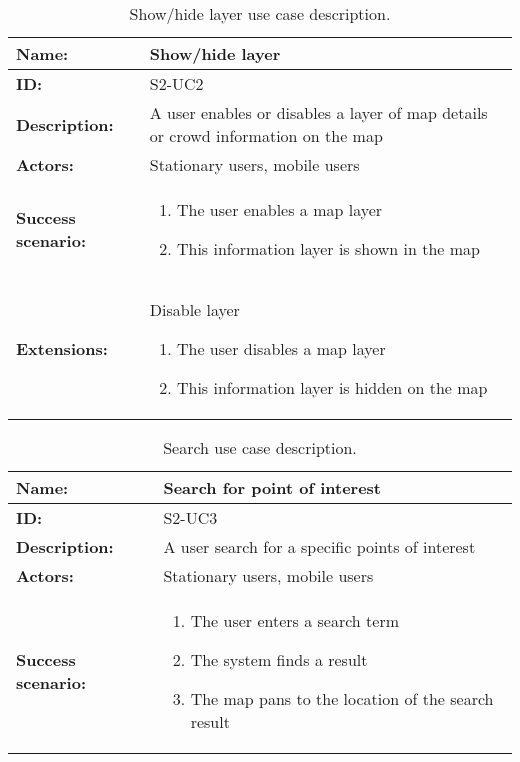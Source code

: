 \begin{table}[h!]
    \centering
    \begin{tabularx}{\textwidth}{lX}
        \toprule
        \textbf{Name:}  & Show/hide layer \\ \midrule
        \textbf{ID:}    & S2-UC2 \\ \midrule
        \textbf{Description:} & A user enables or disables a layer of map details or crowd information on the map \\ \midrule
        \textbf{Actors:} & Stationary users, mobile users \\ \midrule
        \textbf{Success scenario:} & 
        \begin{enumerate}
            \item The user enables a map layer
            \item This information layer is shown in the map
        \end{enumerate}
        \\ \midrule
        \textbf{Extensions:} & Disable layer 
        \begin{enumerate}
            \item The user disables a map layer
            \item This information layer is hidden on the map
        \end{enumerate}
        \\ \bottomrule
    \end{tabularx}
    \caption{Show/hide layer use case description.}
    \label{tab:s2-uc2}
\end{table}

\begin{table}[h!]
    \centering
    \begin{tabularx}{\textwidth}{lX}
        \toprule
        \textbf{Name:}  & Search for point of interest \\ \midrule
        \textbf{ID:}    & S2-UC3 \\ \midrule
        \textbf{Description:} & A user search for a specific points of interest \\ \midrule
        \textbf{Actors:} & Stationary users, mobile users \\ \midrule
        \textbf{Success scenario:} & 
        \begin{enumerate}
            \item The user enters a search term
            \item The system finds a result
            \item The map pans to the location of the search result
        \end{enumerate}
        \\ \bottomrule
    \end{tabularx}
    \caption{Search use case description.}
    \label{tab:s2-uc3}
\end{table}


